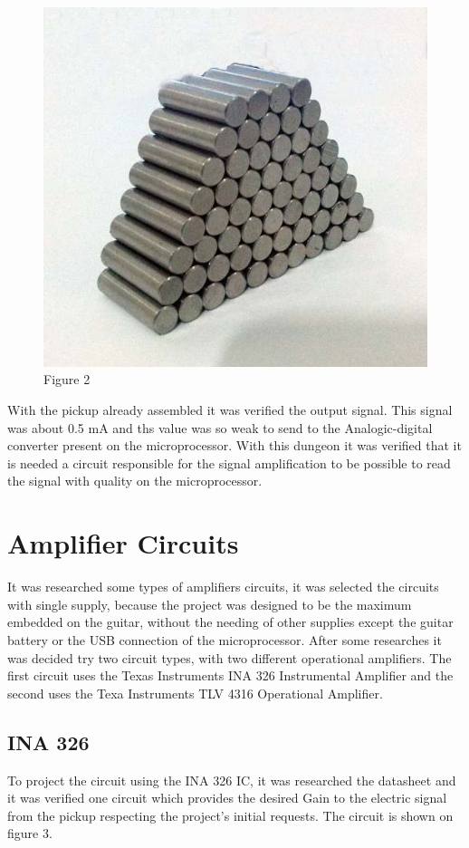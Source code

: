 \begin{figure}[!htpb]
\centering
\includegraphics[scale=0.3]{textual-elements/hardware/ima}
\caption{Figure 2}
\end{figure}

With the pickup already assembled it was verified the output signal. This signal was about 0.5 mA and ths value was so weak to send to the Analogic-digital converter present on the microprocessor. With this dungeon it was verified that it is needed a circuit responsible for the signal amplification to be possible to read the signal with quality on the microprocessor. 

\section{Amplifier Circuits}
It was researched some types of amplifiers circuits, it was selected the circuits with single supply, because the project was designed to be the maximum embedded on the guitar, without the needing of other supplies except the guitar battery or the USB connection of the microprocessor.
After some researches it was decided try two circuit types, with two different operational amplifiers. The first circuit uses the Texas Instruments INA 326 Instrumental Amplifier and the second uses the Texa Instruments TLV 4316 Operational Amplifier.

\subsection{INA 326}
To project the circuit using the INA 326 IC, it was researched the datasheet and it was verified one circuit which provides the desired Gain to the electric signal from the pickup respecting the project's initial requests. The circuit is shown on figure 3. 

